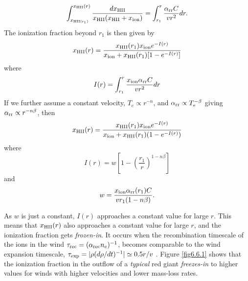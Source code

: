 \begin{equation}
\int_{x_{\rm{HII}(r_1)}}^{x_{\rm{HII}}(r)}\frac{dx_{\rm{HII}}}{x_{\rm{HII}}(x_{\rm{HII}}+x_{\rm{ion}})}=\int_{r_{1}}^r \frac{\alpha _{\rm{rr}} C }{vr^2}dr.
\end{equation}
The ionization fraction beyond $r_{1}$ is then given by
\begin{equation}
x_{\rm{HII}}(r)= \frac{x_{\rm{HII}}(r_1)x_{\rm{ion}}e^{-I(r)}}{x_{\rm{ion}}+x_{\rm{HII}}(r_1)[1 - e^{-I(r)}]}
\label{eq:eq4}
\end{equation}
where
\begin{equation}
I(r)=\int_{r_{1}}^r \frac{x_{\rm{ion}} \alpha _{\rm{rr}}C }{vr^2}dr
\end{equation}
If we further assume a constant velocity, $T_{e} \propto r^{-n}$, and $\alpha _{\rm{rr}} \propto T_e ^{-\beta}$ giving $\alpha _{\rm{rr}} \propto r^{-n\beta}$, then
\begin{equation}
x_{\rm{HII}}(r)=\frac{x_{\rm{HII}}(r_1)x_{\rm{ion}}e^{-I(r)}}{x_{\rm{ion}}+x_{\rm{HII}}(r_1)(1-e^{-I(r)})}
\label{eq:eq6.9.1.5}
\end{equation}
where
\begin{equation}
I(r)=w\left[1-\left(\frac{r_1}{r}\right)^{1-n\beta} \right]
\label{eq:eq6.9.1.6}
\end{equation}
and 
\begin{equation}
w=\frac{x_{\rm{ion}}\alpha_{\rm{rr}}(r_1)C}{vr_1(1-n\beta)}.
\label{eq:eq6.9.1.7}
\end{equation}

As $w$ is just a constant, $I(r)$ approaches a constant value for large $r$. This means that $x_{\rm{HII}}(r)$ also approaches a constant value for large $r$, and the ionization fraction gets \textit{frozen-in}. It occurs when the recombination timescale of the ions in the wind $\tau _{\rm{rec}}=(\alpha _{\rm{rec}}n_e)^{-1}$, becomes comparable to the wind expansion timescale, $\tau _{\rm{exp}}=|\rho (d\rho/dt)^{-1}|\simeq 0.5r/v$ \citep{lamers_1999}. Figure \ref{fig6.6.1} shows that the ionization fraction in the outflow of a \textit{typical} red giant \textit{freezes-in} to higher values for winds with higher velocities and lower mass-loss rates. 


